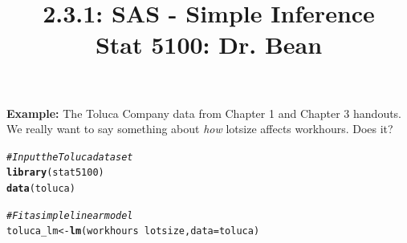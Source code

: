 \documentclass{article}\usepackage[]{graphicx}\usepackage[]{color}
\makeatletter
\newcommand{\hlcom}[1]{\textcolor[rgb]{0.678,0.584,0.686}{\textit{#1}}}%
\newcommand{\hlopt}[1]{\textcolor[rgb]{0,0,0}{#1}}%
\newcommand{\hlstd}[1]{\textcolor[rgb]{0.345,0.345,0.345}{#1}}%
\newcommand{\hlkwb}[1]{\textcolor[rgb]{0.69,0.353,0.396}{#1}}%
\newcommand{\hlkwc}[1]{\textcolor[rgb]{0.333,0.667,0.333}{#1}}%
\newcommand{\hlkwd}[1]{\textcolor[rgb]{0.737,0.353,0.396}{\textbf{#1}}}%
\newenvironment{kframe}{%
 \def\at@end@of@kframe{}%
 \ifinner\ifhmode%
  \def\at@end@of@kframe{\end{minipage}}%
  \begin{minipage}{\columnwidth}%
 \fi\fi%
 \def\FrameCommand##1{\hskip\@totalleftmargin \hskip-\fboxsep
 \colorbox{shadecolor}{##1}\hskip-\fboxsep
     \hskip-\linewidth \hskip-\@totalleftmargin \hskip\columnwidth}%
 \MakeFramed {\advance\hsize-\width
   \@totalleftmargin\z@ \linewidth\hsize
   \@setminipage}}%
 {\par\unskip\endMakeFramed%
 \at@end@of@kframe}
\newenvironment{knitrout}{}{} %
\makeatother
\begin{document}
\title{%
  2.3.1: SAS - Simple Inference \\
  \smallskip
  \large Stat 5100: Dr. Bean
}
\date{}

\maketitle

\textbf{Example: } The Toluca Company data from Chapter 1 and Chapter 3 handouts. We really want to say something about \textit{how} lotsize affects workhours. Does it?

\begin{knitrout}
\color{fgcolor}\begin{kframe}
\begin{alltt}
\hlcom{#Input the Toluca dataset}
\hlkwd{library}\hlstd{(stat5100)}
\hlkwd{data}\hlstd{(toluca)}

\hlcom{# Fit a simple linear model}
\hlstd{toluca_lm} \hlkwb{<-} \hlkwd{lm}\hlstd{(workhours} \hlopt{~} \hlstd{lotsize,} \hlkwc{data} \hlstd{= toluca)}


\end{alltt}
\end{kframe}
\end{knitrout}
\end{document}
